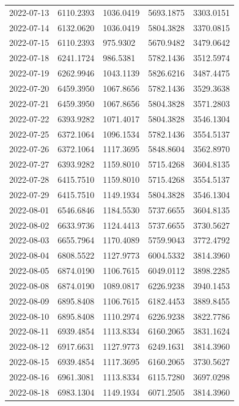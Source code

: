 \begin{footnotesize}
\begin{longtable}{lllll}
2022-07-13 & 6110.2393 & 1036.0419 & 5693.1875 & 3303.0151 \\
2022-07-14 & 6132.0620 & 1036.0419 & 5804.3828 & 3370.0815 \\
2022-07-15 & 6110.2393 & 975.9302 & 5670.9482 & 3479.0642 \\
2022-07-18 & 6241.1724 & 986.5381 & 5782.1436 & 3512.5974 \\
2022-07-19 & 6262.9946 & 1043.1139 & 5826.6216 & 3487.4475 \\
2022-07-20 & 6459.3950 & 1067.8656 & 5782.1436 & 3529.3638 \\
2022-07-21 & 6459.3950 & 1067.8656 & 5804.3828 & 3571.2803 \\
2022-07-22 & 6393.9282 & 1071.4017 & 5804.3828 & 3546.1304 \\
2022-07-25 & 6372.1064 & 1096.1534 & 5782.1436 & 3554.5137 \\
2022-07-26 & 6372.1064 & 1117.3695 & 5848.8604 & 3562.8970 \\
2022-07-27 & 6393.9282 & 1159.8010 & 5715.4268 & 3604.8135 \\
2022-07-28 & 6415.7510 & 1159.8010 & 5715.4268 & 3554.5137 \\
2022-07-29 & 6415.7510 & 1149.1934 & 5804.3828 & 3546.1304 \\
2022-08-01 & 6546.6846 & 1184.5530 & 5737.6655 & 3604.8135 \\
2022-08-02 & 6633.9736 & 1124.4413 & 5737.6655 & 3730.5627 \\
2022-08-03 & 6655.7964 & 1170.4089 & 5759.9043 & 3772.4792 \\
2022-08-04 & 6808.5522 & 1127.9773 & 6004.5332 & 3814.3960 \\
2022-08-05 & 6874.0190 & 1106.7615 & 6049.0112 & 3898.2285 \\
2022-08-08 & 6874.0190 & 1089.0817 & 6226.9238 & 3940.1453 \\
2022-08-09 & 6895.8408 & 1106.7615 & 6182.4453 & 3889.8455 \\
2022-08-10 & 6895.8408 & 1110.2974 & 6226.9238 & 3822.7786 \\
2022-08-11 & 6939.4854 & 1113.8334 & 6160.2065 & 3831.1624 \\
2022-08-12 & 6917.6631 & 1127.9773 & 6249.1631 & 3814.3960 \\
2022-08-15 & 6939.4854 & 1117.3695 & 6160.2065 & 3730.5627 \\
2022-08-16 & 6961.3081 & 1113.8334 & 6115.7280 & 3697.0298 \\
2022-08-18 & 6983.1304 & 1149.1934 & 6071.2505 & 3814.3960 \\

\end{longtable}
\end{footnotesize}
